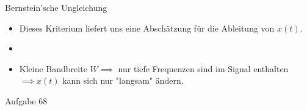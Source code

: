 \documentclass[14pt, aspectratio=169, handout]{beamer}
\begin{document}
\begin{frame}{Bernstein'sche Ungleichung}
    \begin{itemize}
    \item Dieses Kriterium liefert uns eine Abschätzung für die Ableitung von $x(t)$.
    \item[] 
    \item Kleine Bandbreite $W \implies$ nur tiefe Frequenzen sind im Signal enthalten $\implies x(t)$ kann sich nur "langsam" ändern.
\end{itemize}
\end{frame}

\begin{frame}{Aufgabe 68}
    
\end{frame}
\end{document}

